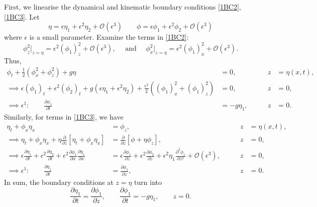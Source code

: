 \documentclass[10pt,reqno,oneside,a4paper]{article}
\begin{document}
First, we linearise the dynamical and kinematic boundary conditions \eqref{1BC2}, \eqref{1BC3}. Let 
\[ \eta = \epsilon \eta_1 + \epsilon^2 \eta_2 + \mathcal{O}(\epsilon^3) \qquad \phi = \epsilon \phi_1 + \epsilon^2\phi_2 + \mathcal{O}(\epsilon^3) \]
where $\epsilon$ is a small parameter. Examine the terms in \eqref{1BC2}:
\[
\phi_z^2 \Big\vert_{z= \eta} = \epsilon^2 (\phi_1)_z^2 + \mathcal{O}(\epsilon^3), \quad \textrm{ and } \quad \phi_x^2 \Big\vert_{z= \eta} = \epsilon^2 (\phi_1)_x^2 + \mathcal{O}(\epsilon^3).
\]
Thus, 
\begin{align*}
\phi_t + \frac{1}{2} (\phi_{x}^2 + \phi_{z}^2) + g \eta &= 0, \qquad &z&= \eta(x,t), \\
\implies \epsilon(\phi_1)_t + \epsilon^2 (\phi_2)_t + g(\epsilon\eta_1 + \epsilon^2\eta_2) + \frac{\epsilon^2}{2}\left((\phi_1)_x^2 + (\phi_1)_z^2 \right) &= 0, \qquad &z&=0, \\
\implies \epsilon^1: \qquad \frac{\partial \phi_1}{\partial t} &= - g \eta_1, \qquad &z&= 0.
\end{align*}
Similarly, for terms in \eqref{1BC3}, we have 
\begin{align*}
\eta_t + \phi_x\eta_x &= \phi_z, \qquad &z&= \eta(x,t), \\
\implies \eta_t + \phi_x\eta_x+ \eta \frac{\partial}{\partial z}\left[ \eta_t + \phi_x\eta_x \right] &= \frac{\partial}{\partial z}\left[ \phi + \eta \phi_z \right], \qquad &z&= 0, \\
\implies \epsilon\frac{\partial \eta_1}{\partial t} + \epsilon^2\frac{\partial \eta_2}{\partial t} + \epsilon^2\frac{\partial \phi_1}{\partial x} \frac{\partial \eta_1}{\partial x}  &= \epsilon\frac{\partial \phi_1}{\partial z} + \epsilon^2 \frac{\partial \phi_2}{\partial z} + \epsilon^2 \eta_1 \frac{\partial^2 \phi_1}{\partial z^2} + \mathcal{O}(\epsilon^3), \qquad &z&= 0,\\
\implies \epsilon^1: \qquad \frac{\partial \eta_1}{\partial t}  &= \frac{\partial \phi_1}{\partial z}, \qquad &z&= 0.
\end{align*}
In sum, the boundary conditions at $z = \eta$ turn into 
\begin{equation}\label{linearisedBCs}
\frac{\partial \eta_1}{\partial t} = \frac{\partial \phi_1}{\partial z}, \qquad \frac{\partial \phi_1}{\partial t} = - g \eta_1, \qquad z=0.
\end{equation}
\end{document}
